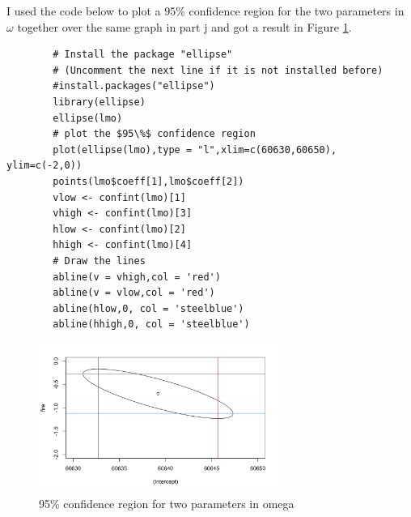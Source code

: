 \begin{answer}
    I used the code below to plot a $95\%$ confidence region for the two parameters in $\omega$ together over the same graph in part j and got a result in Figure \ref{fig:fig13}.
    \begin{verbatim}
        # Install the package "ellipse"
        # (Uncomment the next line if it is not installed before)
        #install.packages("ellipse")
        library(ellipse)
        ellipse(lmo)
        # plot the $95\%$ confidence region
        plot(ellipse(lmo),type = "l",xlim=c(60630,60650), ylim=c(-2,0))
        points(lmo$coeff[1],lmo$coeff[2])
        vlow <- confint(lmo)[1]
        vhigh <- confint(lmo)[3]
        hlow <- confint(lmo)[2]
        hhigh <- confint(lmo)[4]
        # Draw the lines
        abline(v = vhigh,col = 'red')
        abline(v = vlow,col = 'red')
        abline(hlow,0, col = 'steelblue')
        abline(hhigh,0, col = 'steelblue')
    \end{verbatim}
    \begin{figure}[H]
        \centering
        \includegraphics[width=0.7\textwidth]{Figure 13.png}
        \caption{\label{fig:fig13}95\% confidence region for two parameters in omega}
    \end{figure}
\end{answer}